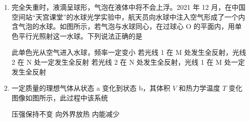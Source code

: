 \documentclass[\gkver]{gaokaozhenti}
\begin{document}
\begin{enumerate}
{$F_{2y} - F_{1y} = \frac{mg \sin \alpha \cos \beta}{\sin (\alpha + \beta)} - \frac{mg \sin \beta \cos \alpha}{\sin (\alpha + \beta)} = \frac{mg (\sin \alpha \cos \beta - \sin \beta \cos \alpha)}{\sin (\alpha + \beta)}$

因 $\sin \alpha \cos \beta - \cos \alpha \sin \beta = \sin (\alpha - \beta) > 0$

可知 $F_{2y} > F_{1y}$，选项 AB 错误。
}

\item
完全失重时，液滴呈球形，气泡在液体中将不会上浮。2021 年 12 月，在中国空间站“天宫课堂”的水球光学实验中，航天员向水球中注入空气形成了一个内含气泡的水球。如图所示，若气泡与水球同心，在过球心 O 的平面内，用单色平行光照射这一水球。下列说法正确的是

\onepicture[w=4.48cm]{}

{此单色光从空气进入水球，频率一定变小}
{若光线 1 在 M 处发生全反射，光线 2 在 N 处一定发生全反射}
{若光线 2 在 N 处发生全反射，光线 1 在 M 处一定发生全反射}


\item
一定质量的理想气体从状态 a 变化到状态 b，其体积 $V$ 和热力学温度 $T$ 变化图像如图所示，此过程中该系统


{压强保持不变}
{向外界放热}
{内能减少}


\end{enumerate}
\end{document}
